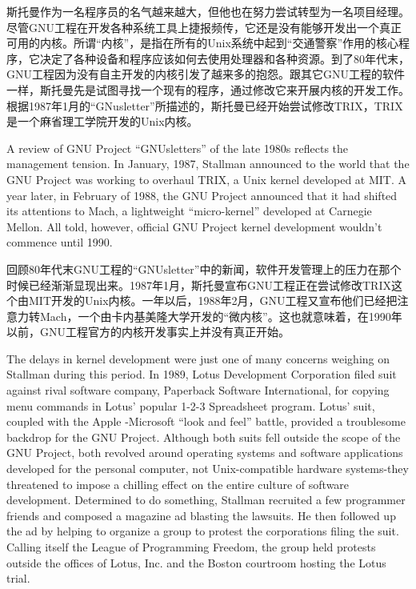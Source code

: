\ifdefined\chs
斯托曼作为一名程序员的名气越来越大，但他也在努力尝试转型为一名项目经理。尽管GNU工程在开发各种系统工具上捷报频传，它还是没有能够开发出一个真正可用的内核。所谓``内核''，是指在所有的Unix系统中起到``交通警察''作用的核心程序，它决定了各种设备和程序应该如何去使用处理器和各种资源。到了80年代末，GNU工程因为没有自主开发的内核引发了越来多的抱怨。跟其它GNU工程的软件一样，斯托曼先是试图寻找一个现有的程序，通过修改它来开展内核的开发工作。根据1987年1月的``GNusletter''所描述的，斯托曼已经开始尝试修改TRIX，TRIX是一个麻省理工学院开发的Unix内核。
\fi

\ifdefined\eng
A review of GNU Project ``GNUsletters'' of the late 1980s reflects the management tension. In January, 1987, Stallman announced to the world that the GNU Project was working to overhaul TRIX, a Unix kernel developed at MIT. A year later, in February of 1988, the GNU Project announced that it had shifted its attentions to Mach, a lightweight ``micro-kernel'' developed at Carnegie Mellon. All told, however, official GNU Project kernel development wouldn't commence until 1990. 
\fi

\ifdefined\chs
回顾80年代末GNU工程的``GNUsletter''中的新闻，软件开发管理上的压力在那个时候已经渐渐显现出来。1987年1月，斯托曼宣布GNU工程正在尝试修改TRIX这个由MIT开发的Unix内核。一年以后，1988年2月，GNU工程又宣布他们已经把注意力转Mach，一个由卡内基美隆大学开发的``微内核''。这也就意味着，在1990年以前，GNU工程官方的内核开发事实上并没有真正开始。
\fi

\ifdefined\eng
The delays in kernel development were just one of many concerns weighing on Stallman during this period. In 1989, Lotus Development Corporation filed suit against rival software company, Paperback Software International, for copying menu commands in Lotus' popular 1-2-3 Spreadsheet program. Lotus' suit, coupled with the Apple -Microsoft ``look and feel'' battle, provided a troublesome backdrop for the GNU Project. Although both suits fell outside the scope of the GNU Project, both revolved around operating systems and software applications developed for the personal computer, not Unix-compatible hardware systems-they threatened to impose a chilling effect on the entire culture of software development. Determined to do something, Stallman recruited a few programmer friends and composed a magazine ad blasting the lawsuits. He then followed up the ad by helping to organize a group to protest the corporations filing the suit. Calling itself the League of Programming Freedom, the group held protests outside the offices of Lotus, Inc. and the Boston courtroom hosting the Lotus trial.
\fi

